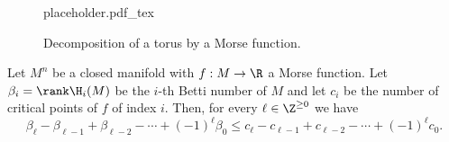 \begin{figure}[ht]
	{placeholder.pdf_tex}
	\caption{Decomposition of a torus by a Morse function.}
\end{figure}


\begin{theorem}
	Let $M^n$ be a closed manifold with $f : M\to \R$ a Morse function. Let $\beta_i=\rank \H_i(M)$ be the $i$-th Betti number of $M$ and let $c_i$ be the number of critical points of $f$ of index $i$. Then, for every $\ell\in \Z^{\geq 0}$ we have
	\begin{equation}
		\beta_\ell - \beta_{\ell-1} + \beta_{\ell-2} - \cdots +(-1)^\ell \beta_0 \leq c_\ell - c_{\ell-1} + c_{\ell-2} - \cdots + (-1)^\ell c_0.
	\end{equation}
\end{theorem}

